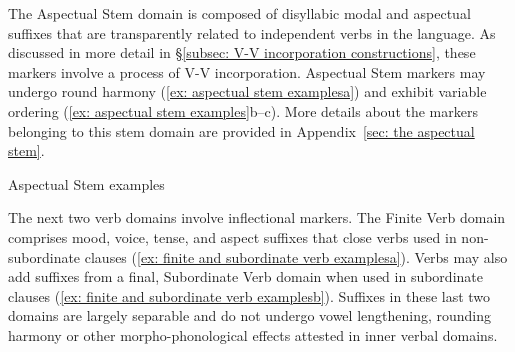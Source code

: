 The Aspectual Stem domain is composed of disyllabic modal and aspectual suffixes that are transparently related to independent verbs in the language. As discussed in more detail in §\ref{subsec: V-V incorporation constructions}, these markers involve a process of V-V incorporation. Aspectual Stem markers may undergo round harmony (\ref{ex: aspectual stem examplesa}) and exhibit variable ordering (\ref{ex: aspectual stem examples}b--c). More details about the markers belonging to this stem domain are provided in Appendix~\ref{sec: the aspectual stem}.

\ea\label{ex: aspectual stem examples}
{Aspectual Stem examples}

    \label{ex: aspectual stem examplesa}
        \label{ex: aspectual stem examplesb}
            \label{ex: aspectual stem examplesc}
    \z
\z

The next two verb domains involve inflectional markers. The Finite Verb domain comprises mood, voice, tense, and aspect suffixes that close verbs used in non-subordinate clauses (\ref{ex: finite and subordinate verb examplesa}). Verbs may also add suffixes from a final, Subordinate Verb domain when used in subordinate clauses (\ref{ex: finite and subordinate verb examplesb}). Suffixes in these last two domains are largely separable and do not undergo vowel lengthening, rounding harmony or other morpho-phonological effects attested in inner verbal domains.


